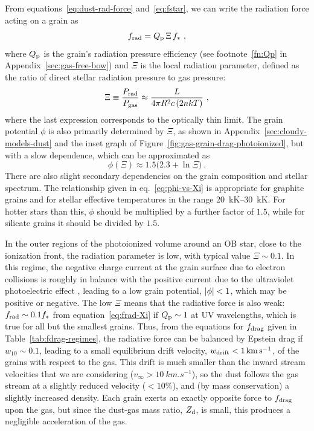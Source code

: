 From equations~\eqref{eq:dust-rad-force} and~\eqref{eq:fstar}, we can
write the radiation force acting on a grain as
\begin{equation}
  \label{eq:frad-Xi}
  f_{\text{rad}} = Q_{\text{p}}\, \Xi\, f_* \ ,
\end{equation}
where \(Q_{\text{p}}\) is the grain's radiation pressure efficiency (see
footnote~\ref{fn:Qp} in Appendix~\ref{sec:gas-free-bow}) and \(\Xi\) is
the local radiation parameter, defined as the ratio of direct stellar
radiation pressure to gas pressure:
\begin{equation}
  \label{eq:Xi-Prad-over-Pgas}
  \Xi \equiv \frac{P_{\text{rad}}}{P_{\text{gas}}} \approx \frac{L}{4 \pi R^2 c\, (2 n k T)} \ ,
\end{equation}
where the last expression corresponds to the optically thin limit.
The grain potential \(\phi\) is also primarily determined by \(\Xi\), as
shown in Appendix~\ref{sec:cloudy-models-dust} and the inset graph of
Figure~\ref{fig:gas-grain-drag-photoionized}, but with a slow
dependence, which can be approximated as
\begin{equation}
  \label{eq:phi-vs-Xi}
  \phi(\Xi) \approx 1.5 \bigl( 2.3 +  \ln \Xi \bigr) \ .
\end{equation}
There are also slight secondary dependencies on the grain composition and
stellar spectrum.  The relationship given in eq.~\eqref{eq:phi-vs-Xi}
is appropriate for graphite grains and for stellar effective
temperatures in the range \SIrange{20}{30}{kK}.  For hotter stars than
this, \(\phi\) should be multiplied by a further factor of \(1.5\), while
for silicate grains it should be divided by \(1.5\).

In the outer regions of the photoionized volume around an OB star,
close to the ionization front, the radiation parameter is low, with
typical value \(\Xi \sim 0.1\).  In this regime, the negative charge
current at the grain surface due to electron collisions is roughly in
balance with the positive current due to the ultraviolet photoelectric
effect \citep{Weingartner:2001b}, leading to a low grain potential,
\(\lvert\phi\rvert < 1\), which may be positive or negative.  The low
\(\Xi\) means that the radiative force is also weak:
\(f_{\text{rad}} \sim 0.1 f_*\) from equation~\eqref{eq:frad-Xi} if
\(Q_{\text{p}} \sim 1\) at UV wavelengths, which is true for all but the smallest
grains.  Thus, from the equations for \(f_{\text{drag}}\) given in
Table~\ref{tab:fdrag-regimes}, the radiative force can be balanced by
Epstein drag if \(w_{10} \sim 0.1\), leading to a small equilibrium drift
velocity, \(w_{\text{drift}} < \SI{1}{km.s^{-1}}\), of the grains with respect
to the gas.  This drift is much smaller than the inward stream
velocities that we are considering
(\(v_\infty > \SI{10}{km.s^{-1}}\)), so the dust follows the gas stream at
a slightly reduced velocity (\(< 10\%\)), and (by mass conservation) a
slightly increased density.  Each grain exerts an exactly opposite
force to \(f_{\text{drag}}\) upon the gas, but since the dust-gas mass ratio,
\(Z_{\text{d}}\), is small, this produces a negligible acceleration of the
gas.


